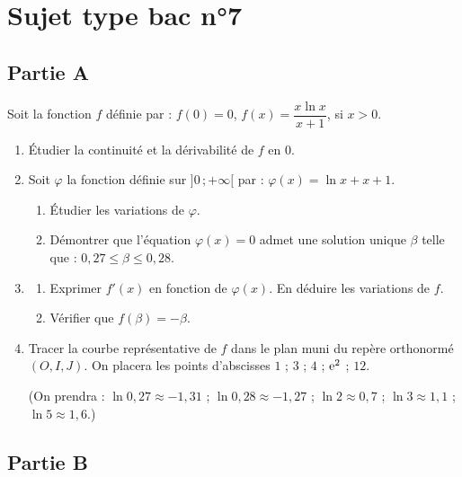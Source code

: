 \section*{Sujet type bac n°7}

\subsection*{Partie A}

Soit la fonction $f$ définie par : $f(0)=0$, $f(x) = \dfrac{x\ln x}{x+1}$, si $x>0$.

\begin{enumerate}
	\item Étudier la continuité et la dérivabilité de $f$ en $0$.
	\item Soit $\varphi$ la fonction définie sur $]0\,;+\infty[$ par : $\varphi(x) = \ln x + x + 1$.
	\begin{enumerate}
		\item Étudier les variations de $\varphi$.
		\item Démontrer que l'équation $\varphi(x)=0$ admet une solution unique $\beta$ telle que : $0,27 \leqslant \beta \leqslant 0,28$.
	\end{enumerate}
	\item
	\begin{enumerate}
		\item Exprimer $f'(x)$ en fonction de $\varphi(x)$. En déduire les variations de $f$.
		\item Vérifier que $f(\beta) = -\beta$.
	\end{enumerate}
	\item Tracer la courbe représentative de $f$ dans le plan muni du repère orthonormé $(O,I,J)$. On placera les points d'abscisses $1$ ; $3$ ; $4$ ; $\mathrm{e}^2$ ; $12$.

	(On prendra : $\ln 0,27 \approx -1,31$ ; $\ln 0,28 \approx -1,27$ ; $\ln 2 \approx 0,7$ ; $\ln 3 \approx 1,1$ ; $\ln 5 \approx 1,6$.)
\end{enumerate}

\subsection*{Partie B}

